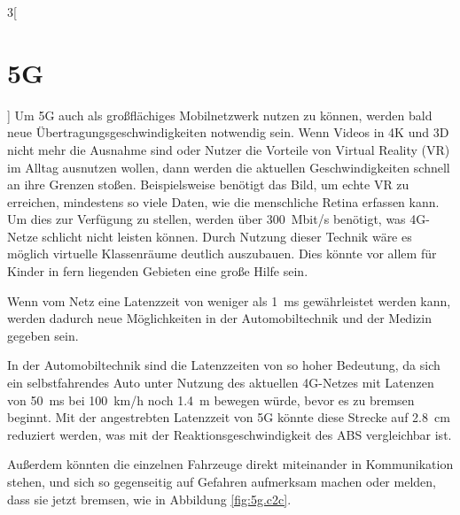 \begin{multicols}{3}[\section{5G}]
Um 5G auch als großflächiges Mobilnetzwerk nutzen zu können, werden bald neue Übertragungsgeschwindigkeiten notwendig sein. Wenn Videos in 4K und 3D nicht mehr die Ausnahme sind oder Nutzer die Vorteile von Virtual Reality (VR) im Alltag ausnutzen wollen, dann werden die aktuellen Geschwindigkeiten schnell an ihre Grenzen stoßen.
Beispielsweise benötigt das Bild, um echte VR zu erreichen, mindestens so viele Daten, wie die menschliche Retina erfassen kann. Um dies zur Verfügung zu stellen, werden über \SI{300}{\mega bit/\second} benötigt, was 4G-Netze schlicht nicht leisten können.
Durch Nutzung dieser Technik wäre es möglich virtuelle Klassenräume deutlich auszubauen. Dies könnte vor allem für Kinder in fern liegenden Gebieten eine große Hilfe sein.

Wenn vom Netz eine Latenzzeit von weniger als \SI{1}{\milli\second} gewährleistet werden kann, werden dadurch neue Möglichkeiten in der Automobiltechnik und der Medizin gegeben sein.

In der Automobiltechnik sind die Latenzzeiten von so hoher Bedeutung, da sich ein selbstfahrendes Auto unter Nutzung des aktuellen 4G-Netzes mit Latenzen von \SI{50}{\milli\second} bei \SI{100}{\kilo\metre /\hour} noch \SI{1.4}{\metre} bewegen würde, bevor es zu bremsen beginnt. Mit der angestrebten Latenzzeit von 5G könnte diese Strecke auf \SI{2.8}{\centi\metre} reduziert werden, was mit der Reaktionsgeschwindigkeit des ABS vergleichbar ist.

Außerdem könnten die einzelnen Fahrzeuge direkt miteinander in Kommunikation stehen, und sich so gegenseitig auf Gefahren aufmerksam machen oder melden, dass sie jetzt bremsen, wie in Abbildung \ref{fig:5g.c2c}.
\end{multicols}
\newpage
